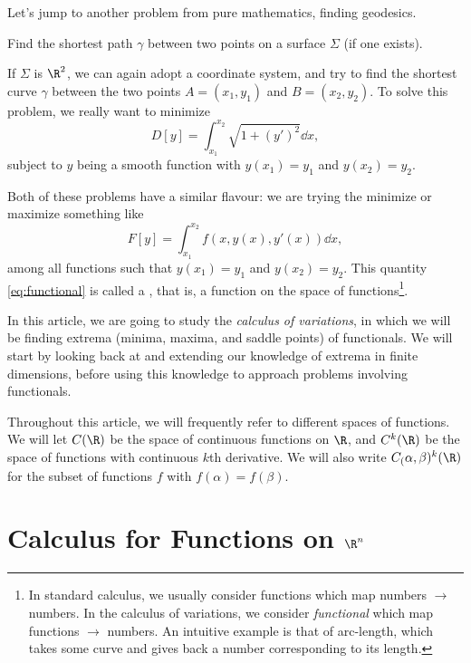 \documentclass[a4paper]{scrartcl}
\begin{document}
Let's jump to another problem from pure mathematics, finding geodesics.

\begin{example}
	Find the shortest path $\gamma$ between two points on a surface $\Sigma$ (if one exists).
\end{example}


If $\Sigma$ is $\R^2$, we can again adopt a coordinate system, and try to find the shortest curve $\gamma$ between the two points $A = (x_1, y_1)$ and $B=(x_2, y_2)$.
To solve this problem, we really want to minimize
$$
D[y] = \int_{x_1}^{x_2} \sqrt{1 + (y')^2} \dd{x},
$$
subject to $y$ being a smooth function with $y(x_1) = y_1$ and $y(x_2) = y_2$.

Both of these problems have a similar flavour: we are trying the minimize or maximize something like
\begin{equation}\label{eq:functional}
	F[y] = \int_{x_1}^{x_2} f(x, y(x), y'(x)) \dd x, \tag{$*$}
\end{equation}
among all functions such that $y(x_1) = y_1$ and $y(x_2) = y_2$.
This quantity \eqref{eq:functional} is called a , that is, a function on the space of functions\footnote{In standard calculus, we usually consider functions which map numbers $\rightarrow$ numbers. In the calculus of variations, we consider \emph{functional} which map functions $\rightarrow$ numbers. An intuitive example is that of arc-length, which takes some curve and gives back a number corresponding to its length.}.

In this article, we are going to study the \emph{calculus of variations}, in which we will be finding extrema (minima, maxima, and saddle points) of functionals. 
We will start by looking back at and extending our knowledge of extrema in finite dimensions, before using this knowledge to approach problems involving functionals.

\begin{notation}
	Throughout this article, we will frequently refer to different spaces of functions. We will let $C(\R)$ be the space of continuous functions on $\R$, and $C^k(\R)$ be the space of functions with continuous $k$th derivative. We will also write $C_(\alpha, \beta)^k(\R)$ for the subset of functions $f$ with $f(\alpha) = f(\beta)$.
\end{notation}


\section{Calculus for Functions on \texorpdfstring{$\R^n$}{R-n}}
\end{document}
